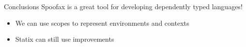\documentclass[aspectratio=43]{beamer}
\begin{document}
\begin{frame}[fragile]{Conclusions}
	Spoofax is a great tool for developing dependently typed languages!
	\begin{itemize}
		\item We can use scopes to represent environments and contexts
		\item Statix can still use improvements
	\end{itemize}
	
\end{frame}

\end{document}
